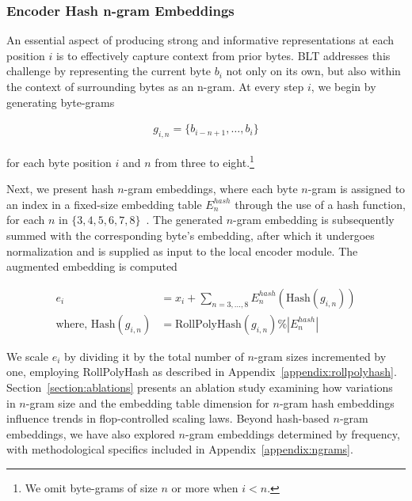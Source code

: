\subsubsection{Encoder Hash n-gram Embeddings}
\label{sec:ngram-emb}
\label{sec:hash-emb}
An essential aspect of producing strong and informative representations at each position $i$ is to effectively capture context from prior bytes. {\textsc BLT} addresses this challenge by representing the current byte $b_i$ not only on its own, but also within the context of surrounding bytes as an n-gram. At every step $i$, we begin by generating byte-grams

\begin{align}
    g_{i,n}=\{b_{i-n + 1},\ldots, b_i\}
\end{align}

for each byte position $i$ and $n$ from three to eight.\footnote{
We omit byte-grams of size $n$ or more when $i<n$. }

Next, we present hash $n$-gram embeddings, where each byte $n$-gram is assigned to an index in a fixed-size embedding table $E_{n}^{hash}$ through the use of a hash function, for each $n$ in $\{3,4,5,6,7,8\}$~\citep{bai2010learning}. The generated $n$-gram embedding is subsequently summed with the corresponding byte's embedding, after which it undergoes normalization and is supplied as input to the local encoder module. The augmented embedding is computed

\begin{align}
e_i &= x_i + \sum_{n = 3,...,8}E_{n}^{hash}(\text{Hash}(g_{i,n})) \\
\text{where, Hash}(g_{i,n}) &= \text{RollPolyHash}(g_{i,n}) \% |E_{n}^{hash}|
\end{align}

We scale $e_i$ by dividing it by the total number of $n$-gram sizes incremented by one, employing RollPolyHash as described in Appendix~\ref{appendix:rollpolyhash}. Section~\ref{section:ablations} presents an ablation study examining how variations in $n$-gram size and the embedding table dimension for $n$-gram hash embeddings influence trends in flop-controlled scaling laws. Beyond hash-based $n$-gram embeddings, we have also explored $n$-gram embeddings determined by frequency, with methodological specifics included in Appendix~\ref{appendix:ngrams}.


